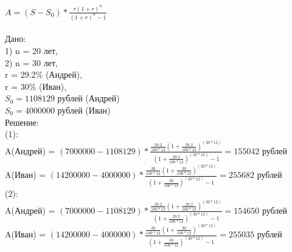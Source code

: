 \documentclass[12pt, a4paper]{report}
\begin{document}
	\( A = (S - S_{0}) * \frac{r (1 + r)^n}{(1 + r)^n - 1} \) \\
	\\
	Дано: \\
	1) n = 20 лет, \\
	2) n = 30 лет, \\
	r = 29.2\% (Андрей), \\
	r = 30\% (Иван), \\
	\( S_{0} = 1108129 \) рублей (Андрей) \\
	\( S_{0} = 4000000 \) рублей (Иван) \\
	Решение: \\
	(1): \\
	A(Андрей) = \( (7000000 - 1108129) * \frac{\frac{29.2}{100*12} (1 + \frac{29.2}{100*12})^{(20 * 12)}}{(1 + \frac{29.2}{100*12})^{(20 * 12)} - 1} = 155042 \) рублей \\
	A(Иван) = \( (14200000 - 4000000) * \frac{\frac{30}{100*12} (1 + \frac{30}{100*12})^{(20 * 12)}}{(1 + \frac{30}{100*12})^{(20 * 12)} - 1} = 255682\) рублей \\
	(2): \\
	A(Андрей) = \( (7000000 - 1108129) * \frac{\frac{29.2}{100*12} (1 + \frac{29.2}{100*12})^{(30 * 12)}}{(1 + \frac{29.2}{100*12})^{(30 * 12)} - 1} = 154650 \) рублей \\
	A(Иван) = \( (14200000 - 4000000) * \frac{\frac{30}{100*12} (1 + \frac{30}{100*12})^{(30 * 12)}}{(1 + \frac{30}{100*12})^{(30 * 12)} - 1} = 255035\) рублей \\
\end{document}
